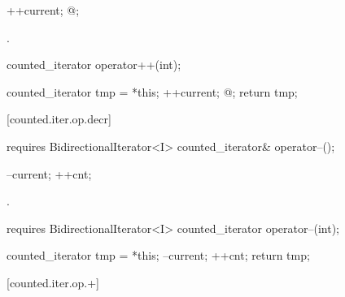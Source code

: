 \begin{addedblock}
\begin{itemdescr}
\pnum
\effects
\begin{codeblock}
++current;
@\dcr@cnt;
\end{codeblock}

\pnum
\returns {}.
\end{itemdescr}

%
%
\begin{itemdecl}
counted_iterator operator++(int);
\end{itemdecl}

\begin{itemdescr}
\pnum
\requires {}

\pnum
\effects
\begin{codeblock}
counted_iterator tmp = *this;
++current;
@\dcr@cnt;
return tmp;
\end{codeblock}
\end{itemdescr}

[counted.iter.op.decr]{}

%
%
\begin{itemdecl}
requires BidirectionalIterator<I>
  counted_iterator& operator--();
\end{itemdecl}

\begin{itemdescr}
\pnum
\effects
\begin{codeblock}
--current;
++cnt;
\end{codeblock}

\pnum
\returns {}.
\end{itemdescr}

%
%
\begin{itemdecl}
requires BidirectionalIterator<I>
  counted_iterator operator--(int);
\end{itemdecl}

\begin{itemdescr}
\pnum
\effects
\begin{codeblock}
counted_iterator tmp = *this;
--current;
++cnt;
return tmp;
\end{codeblock}
\end{itemdescr}

[counted.iter.op.+]{}


\end{addedblock}
